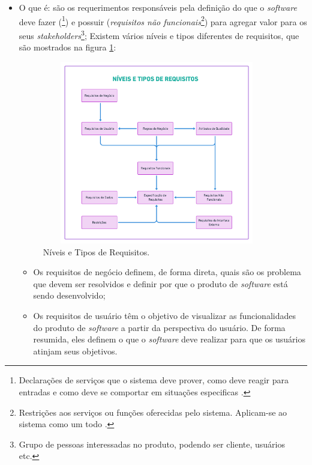 \begin{itemize}
    \item O que é: são os requerimentos responsáveis pela definição do que o \textit{software} deve fazer (\footnote{Declarações de serviços que o sistema deve prover, como deve reagir para entradas e como deve se comportar em situações especificas \cite{sommerville2011}.}) e possuir (\textit{requisitos não funcionais}\footnote{Restrições aos serviços ou funções oferecidas pelo sistema. Aplicam-se ao sistema como um todo \cite{sommerville2011}.}) para agregar valor para os seus \textit{stakeholders}\footnote{Grupo de pessoas interessadas no produto, podendo ser cliente, usuários etc.}; Existem vários níveis e tipos diferentes de requisitos, que são mostrados na figura \ref{lev_tipo_req}:
    
    \begin{figure}[htb]
        \begin{center}
            \includegraphics[width=10cm, height=8cm, keepaspectratio]{figuras/lev_tipo_req.png}
            \caption{{Níveis e Tipos de Requisitos. \cite{westfall_5w2h}}}
            \label{lev_tipo_req}
        \end{center}
    \end{figure}
    
    \begin{itemize}
    
        \item Os requisitos de negócio definem, de forma direta, quais são os problema que devem ser resolvidos e definir por que o produto de \textit{software} está sendo desenvolvido;
        
        \item Os requisitos de usuário têm o objetivo de visualizar as funcionalidades do produto de \textit{software} a partir da perspectiva do usuário. De forma resumida, eles definem o que o \textit{software} deve realizar para que os usuários atinjam seus objetivos.
        

\end{itemize}
\end{itemize}
